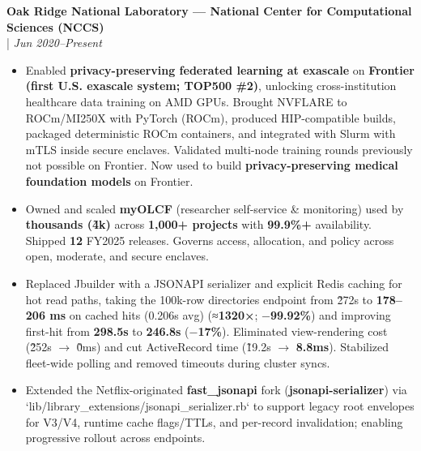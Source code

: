 \documentclass[11pt,a4paper]{article}
\newcommand{\regbullet}[1]{
    \item {\fontsize{10}{12}\selectfont #1}
}
\begin{document}
\noindent\textbf{Oak Ridge National Laboratory — National Center for Computational Sciences (NCCS)}\\
  |  {\fontsize{10}{12}\selectfont\textit{Jun 2020--Present}}\\
\begin{itemize}[leftmargin=18pt,itemsep=1pt,topsep=0pt]
\regbullet{Enabled \textbf{privacy-preserving federated learning at exascale} on \textbf{Frontier (first U.S. exascale system; TOP500 \#2)}, unlocking cross-institution healthcare data training on AMD GPUs. Brought NVFLARE to ROCm/MI250X with PyTorch (ROCm), produced HIP-compatible builds, packaged deterministic ROCm containers, and integrated with Slurm with mTLS inside secure enclaves. Validated multi-node training rounds previously not possible on Frontier. Now used to build \textbf{privacy-preserving medical foundation models} on Frontier.}

\regbullet{Owned and scaled \textbf{myOLCF} (researcher self-service \& monitoring) used by \textbf{thousands (\~4k)} across \textbf{1,000+ projects} with \textbf{99.9\%+} availability. Shipped \textbf{12} FY2025 releases. Governs access, allocation, and policy across open, moderate, and secure enclaves.}

\regbullet{Replaced Jbuilder with a JSON\:API serializer and explicit Redis caching for hot read paths, taking the 100k-row directories endpoint from \~272s to \textbf{178--206 ms} on cached hits (0.206s avg) (≈\textbf{1320×}; −\textbf{99.92\%}) and improving first-hit from \textbf{298.5s} to \textbf{246.8s} (−\textbf{17\%}). Eliminated view-rendering cost (\~252s $\rightarrow$ \~0ms) and cut ActiveRecord time (\~19.2s $\rightarrow$ \textbf{8.8ms}). Stabilized fleet-wide polling and removed timeouts during cluster syncs.}

\regbullet{Extended the Netflix-originated \textbf{fast\_jsonapi} fork (\textbf{jsonapi-serializer}) via `lib/library\_extensions/jsonapi\_serializer.rb` to support legacy root envelopes for V3/V4, runtime cache flags/TTLs, and per-record invalidation; enabling progressive rollout across endpoints.}


\end{itemize}
\end{document}
